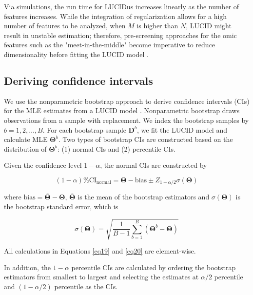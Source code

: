 Via simulations, the run time for LUCIDus increases linearly as the number of features increases. While the integration of regularization allows for a high number of features to be analyzed, when $M$ is higher than $N$, LUCID might result in unstable estimation; therefore, pre-screening approaches for the omic features such as the "meet-in-the-middle" become imperative to reduce dimensionality before fitting the LUCID model \citep{CADIOU2021106509}.


\subsection{Deriving confidence intervals} \label{sec3.4}

We use the nonparametric bootstrap approach to derive confidence intervals (CIs) for the MLE estimates from a LUCID model \citep{davison1997bootstrap}. Nonparametric bootstrap draws observations from a sample with replacement. We index the bootstrap samples by $b = 1, 2, \ldots, B$. For each bootstrap sample $\bm{D}^b$, we fit the LUCID model and calculate MLE $\bm{\Theta}^b$. Two types of bootstrap CIs are constructed based on the distribution of $\bm{\Theta}^b$: (1) normal CIs and (2) percentile CIs.

Given the confidence level $1 - \alpha$, the normal CIs are constructed by

\begin{equation}
    (1 - \alpha)\% \text{CI}_{\text{normal}} = \bm{\Theta} - \text{bias} \pm Z_{1 - \alpha/2}\sigma(\bm \Theta)
    \label{eq19}
\end{equation}

where $\text{bias} = \bar{\bm \Theta} - \bm{\Theta}$, $\bar{\bm \Theta}$ is the mean of the bootstrap estimators and $\sigma(\bm \Theta)$ is the bootstrap standard error, which is

\begin{equation}
    \sigma(\bm \Theta) = \sqrt{\frac{1}{B - 1}\sum_{b=1}^B\left(\bm{\Theta}^b - \bar{\bm \Theta}\right)}
    \label{eq20}
\end{equation}

All calculations in Equations \ref{eq19} and \ref{eq20} are element-wise.

In addition, the $1 - \alpha$ percentile CIs are calculated by ordering the bootstrap estimators from smallest to largest and selecting the estimates at $\alpha/2$ percentile and $(1 - \alpha/2)$ percentile as the CIs.

